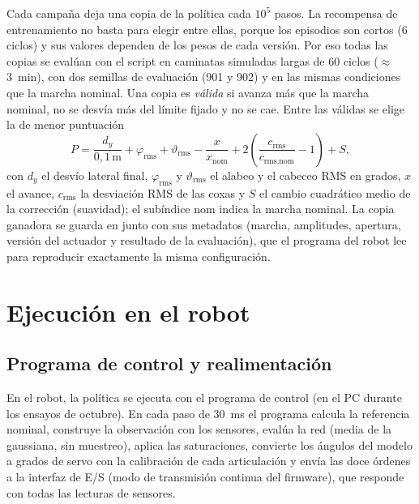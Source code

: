 Cada campaña deja una copia de la política cada $10^5$ pasos. La recompensa de
entrenamiento no basta para elegir entre ellas, porque los episodios son cortos
(6 ciclos) y sus valores dependen de los pesos de cada versión. Por eso todas
las copias se evalúan con el script  en caminatas
simuladas largas de 60 ciclos ($\approx$3~min), con dos semillas de evaluación
(901 y 902) y en las mismas condiciones que la marcha nominal. Una copia es
\emph{válida} si avanza más que la marcha nominal, no se desvía más del límite
fijado y no se cae. Entre las válidas se elige la de menor puntuación
\begin{equation}
    P = \frac{d_y}{0{,}1\,\text{m}} + \varphi_{\text{rms}} + \vartheta_{\text{rms}}
    - \frac{x}{x_{\text{nom}}} + 2\left(\frac{c_{\text{rms}}}{c_{\text{rms,nom}}}-1\right) + S,
    \label{eq:puntuacion-seleccion}
\end{equation}
con $d_y$ el desvío lateral final, $\varphi_{\text{rms}}$ y $\vartheta_{\text{rms}}$
el alabeo y el cabeceo RMS en grados, $x$ el avance, $c_{\text{rms}}$ la
desviación RMS de las coxas y $S$ el cambio cuadrático medio de la corrección
(suavidad); el subíndice nom indica la marcha nominal. La copia ganadora se
guarda en  junto con sus metadatos (marcha, amplitudes,
apertura, versión del actuador y resultado de la evaluación), que el programa
del robot lee para reproducir exactamente la misma configuración.

\section{Ejecución en el robot}

\subsection{Programa de control y realimentación}

En el robot, la política se ejecuta con el programa de control
 (en el PC durante los ensayos de octubre). En cada paso de 30~ms el programa calcula la
referencia nominal, construye la observación con los sensores, evalúa la red
(media de la gaussiana, sin muestreo), aplica las saturaciones, convierte los
ángulos del modelo a grados de servo con la calibración de cada articulación y
envía las doce órdenes a la interfaz de E/S (modo de transmisión continua del
firmware), que responde con todas las lecturas de sensores.

